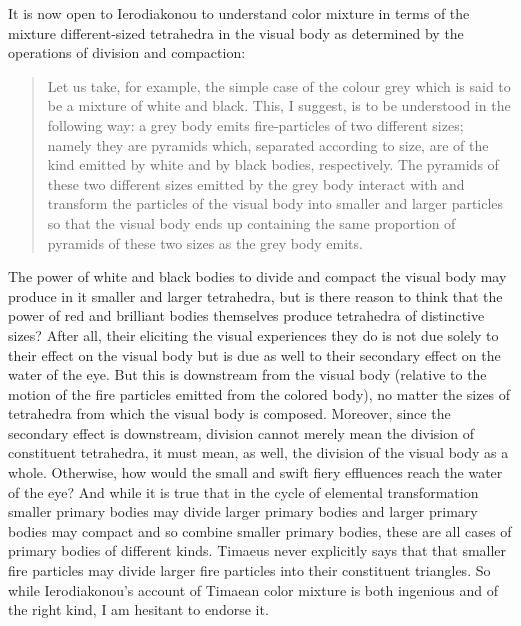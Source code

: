 It is now open to Ierodiakonou to understand color mixture in terms of the mixture different-sized tetrahedra in the visual body as determined by the operations of division and compaction:
\begin{quote}
	Let us take, for example, the simple case of the colour grey which is said to be a mixture of white and black. This, I suggest, is to be understood in the following way: a grey body emits fire-particles of two different sizes; namely they are pyramids which, separated according to size, are of the kind emitted by white and by black bodies, respectively. The pyramids of these two different sizes emitted by the grey body interact with and transform the particles of the visual body into smaller and larger particles so that the visual body ends up containing the same proportion of pyramids of these two sizes as the grey body emits. \citep[228]{Ierodiakonou:2005ly}
\end{quote}
The power of white and black bodies to divide and compact the visual body may produce in it smaller and larger tetrahedra, but is there reason to think that the power of red and brilliant bodies themselves produce tetrahedra of distinctive sizes? After all, their eliciting the visual experiences they do is not due solely to their effect on the visual body but is due as well to their secondary effect on the water of the eye. But this is downstream from the visual body (relative to the motion of the fire particles emitted from the colored body), no matter the sizes of tetrahedra from which the visual body is composed. Moreover, since the secondary effect is downstream, division cannot merely mean the division of constituent tetrahedra, it must mean, as well, the division of the visual body as a whole. Otherwise, how would the small and swift fiery effluences reach the water of the eye? And while it is true that in the cycle of elemental transformation smaller primary bodies may divide larger primary bodies and larger primary bodies may compact and so combine smaller primary bodies, these are all cases of primary bodies of different kinds. Timaeus never explicitly says that that smaller fire particles may divide larger fire particles into their constituent triangles. So while Ierodiakonou's account of Timaean color mixture is both ingenious and of the right kind, I am hesitant to endorse it. 

